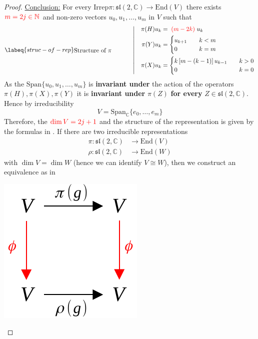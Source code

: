 \documentclass[../main.tex]{subfiles}
\begin{document}
\begin{proof}
\underline{Conclusion:} For every $\textrm{Irrep} \pi:\mathfrak{sl}(2,\mathbb{C})\to\textrm{End}(V)$ there exists ${\color{red}m=2j\in\mathbb{N}}$ and non-zero vectors $u_0,u_1,\dots,u_m$ in $V$ such that
\begin{equation}\labeq{struc-of-rep}
\textrm{\parbox{3cm}{Structure of $\pi$}}\quad\left|\quad
\begin{split}
\pi(H)u_k&={\color{red}\;\left(m-2k\right)\;}u_k\\
\pi(Y)u_k&=
\begin{cases}
u_{k+1}\quad &k<m\\
0\quad &k=m
\end{cases}\\
\pi(X)u_k&=
\begin{cases}
k\left[m-(k-1)\right]u_{k-1}\quad &k>0\\
0\quad &k=0
\end{cases}
\end{split}\right.
\end{equation}
As the $\textrm{Span}\{u_0,u_1,\dots,u_m\}$ is \textbf{invariant under} the action of the operators {\color{red}$\pi(H),\pi(X),\pi(Y)$} it is \textbf{invariant under} {\color{red}$\pi(Z)$} \textbf{for every} {\color{red}$Z\in\mathfrak{sl}(2,\mathbb{C})$}. Hence by irreducibility
\[
V=\textrm{Span}_{\mathbb{C}}\{e_0,\dots,e_m\}
\]
Therefore, the ${\color{red}\dim V=2j+1}$ and the structure of the representation is given by the formulas in . If there are two irreducible representations
\[
\begin{split}
    \pi:\mathfrak{sl}(2,\mathbb{C})&\to\textrm{End}(V)\\
    \rho:\mathfrak{sl}(2,\mathbb{C})&\to\textrm{End}(W)
\end{split}
\]
with $\dim V=\dim W$ (hence we can identify $V\cong W$), then we construct an equivalence as in 
\begin{marginfigure}[-12mm]
	\includegraphics[width=1\linewidth]{images/equiv_class.pdf}

\end{marginfigure}
\end{proof}
\end{document}
